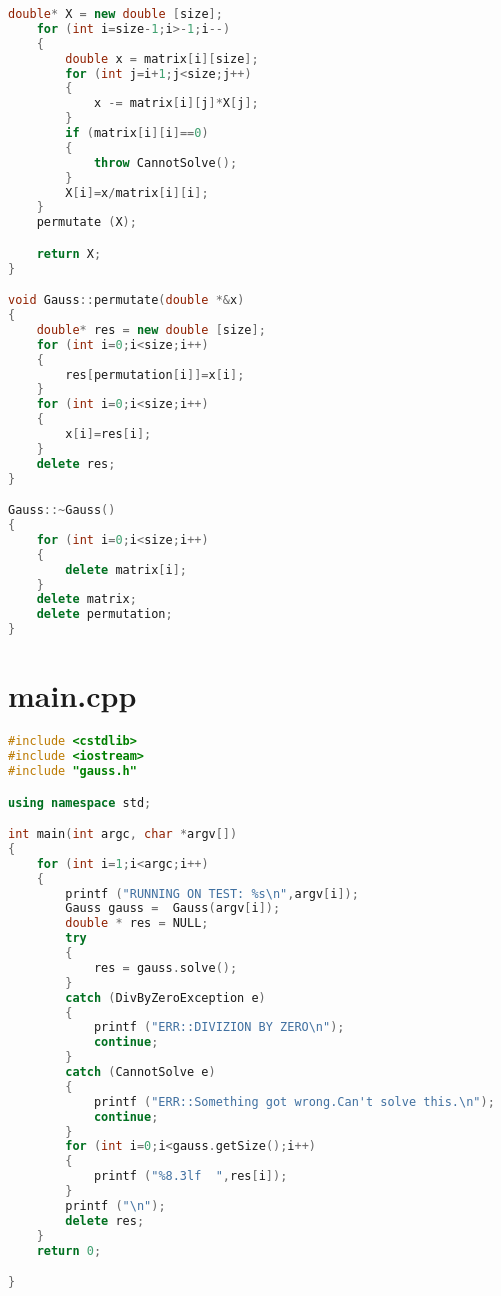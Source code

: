 \documentclass[a4paper,11pt]{article}
\begin{document}
\begin{lstlisting}[language=c++, style=eclipse]
    double* X = new double [size];
    for (int i=size-1;i>-1;i--)
    {
        double x = matrix[i][size];
        for (int j=i+1;j<size;j++)
        {
            x -= matrix[i][j]*X[j];
        }
        if (matrix[i][i]==0)
        {
            throw CannotSolve();
        }
        X[i]=x/matrix[i][i];
    }
    permutate (X);

    return X;
}

void Gauss::permutate(double *&x)
{
    double* res = new double [size];
    for (int i=0;i<size;i++)
    {
        res[permutation[i]]=x[i];
    }
    for (int i=0;i<size;i++)
    {
        x[i]=res[i];
    }
    delete res;
}

Gauss::~Gauss()
{
    for (int i=0;i<size;i++)
    {
        delete matrix[i];
    }
    delete matrix;
    delete permutation;
}
\end{lstlisting}
\newpage
\section*{main.cpp}
\begin{lstlisting}[language=c++, style=eclipse]
#include <cstdlib>
#include <iostream>
#include "gauss.h"

using namespace std;

int main(int argc, char *argv[])
{
    for (int i=1;i<argc;i++)
    {
        printf ("RUNNING ON TEST: %s\n",argv[i]);
        Gauss gauss =  Gauss(argv[i]);
        double * res = NULL;
        try
        {
            res = gauss.solve();
        }
        catch (DivByZeroException e)
        {
            printf ("ERR::DIVIZION BY ZERO\n");
            continue;
        }
        catch (CannotSolve e)
        {
            printf ("ERR::Something got wrong.Can't solve this.\n");
            continue;
        }       
        for (int i=0;i<gauss.getSize();i++)
        {
            printf ("%8.3lf  ",res[i]);
        }
        printf ("\n");
        delete res;
    }
    return 0;

}
\end{lstlisting}
\newpage
\end{document}
